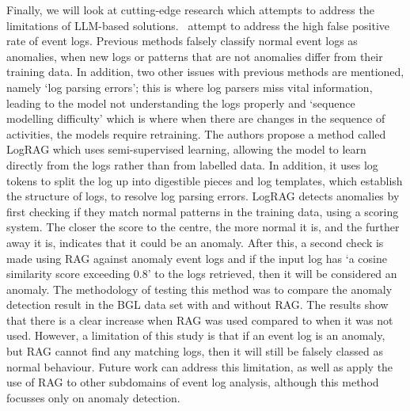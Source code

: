 Finally, we will look at cutting-edge research which attempts to address the limitations of LLM-based solutions.~\cite{10707565} attempt to address the high false positive rate of event logs. Previous methods falsely classify normal event logs as anomalies, when new logs or patterns that are not anomalies differ from their training data. In addition, two other issues with previous methods are mentioned, namely `log parsing errors'; this is where log parsers miss vital information, leading to the model not understanding the logs properly and `sequence modelling difficulty' which is where when there are changes in the sequence of activities, the models require retraining. The authors propose a method called LogRAG which uses semi-supervised learning, allowing the model to learn directly from the logs rather than from labelled data. In addition, it uses log tokens to split the log up into digestible pieces and log templates, which establish the structure of logs, to resolve log parsing errors. LogRAG detects anomalies by first checking if they match normal patterns in the training data, using a scoring system. The closer the score to the centre, the more normal it is, and the further away it is, indicates that it could be an anomaly. After this, a second check is made using RAG against anomaly event logs and if the input log has `a cosine similarity score exceeding 0.8' to the logs retrieved, then it will be considered an anomaly. The methodology of testing this method was to compare the anomaly detection result in the BGL data set with and without RAG. The results show that there is a clear increase when RAG was used compared to when it was not used. However, a limitation of this study is that if an event log is an anomaly, but RAG cannot find any matching logs, then it will still be falsely classed as normal behaviour.  Future work can address this limitation, as well as apply the use of RAG to other subdomains of event log analysis, although this method focusses only on anomaly detection. 

